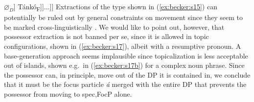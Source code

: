 \documentclass[output=paper,
modfonts
]{langscibook}
\begin{document}
\ea \relax[\textsubscript{FocP} \tikzmark{s16f2}\hspace{2mm}\tikzmark{s16f} [\textsubscript{Foc} c\'i] [\textsubscript{TP} ... [$_{F\tikzmark{s16t}P}$ \'a [\textsubscript{DP} [$_{D'}$ [\textsubscript{NP} nd\'ur] $\varnothing_D$] Tánkó\textsubscript{F}]]...]]
     \label{ex:becker:s16}
\z
\vspace{6mm}
Extractions of the type shown in (\ref{ex:becker:s15}) can potentially be ruled out by general constraints on movement since they seem to be marked cross-linguistically \citep{Corver1990,Zeljko2005}. We would like to point out, however, that possessor extraction is not banned per se, since it is allowed in topic configurations, shown in (\ref{ex:becker:s17}), albeit with a resumptive pronoun. A base-generation approach seems implausible since topicalization is less acceptable out of islands, shown e.g.\ in (\ref{ex:becker:s17b}) for a complex noun phrase.
\ea
{}
\z \z
Since the possessor can, in principle, move out of the DP it is contained in, we conclude that it must be the focus particle {\em \'a} merged with the entire DP that prevents the possessor from moving to spec,FocP alone.
\end{document}
